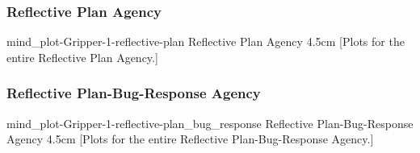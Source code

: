 {\newpage
  \noindent\begin{minipage}{\textwidth}
    \subsubsection{Reflective Plan Agency}
    \experimentcausegroupplots{\dataappendixmaxtime}
                           {\dataappendixexperimentonemaxtime}
                           {\dataappendixexperimenttwomaxtime}
                           {\dataappendixexperimentthreemaxtime}
                           {\dataappendixexperimentonename}
                           {\dataappendixexperimenttwoname}
                           {\dataappendixexperimentthreename}
                           {\dataappendixexperimentoneprettyname}
                           {\dataappendixexperimenttwoprettyname}
                           \experimentcausegroupplotscontinued{\dataappendixexperimentthreeprettyname}
                                                              {mind_plot-Gripper-1-reflective-plan}
                                                              {Reflective Plan Agency}
                                                              {\experimentdatacommontablereference}
                                                              {4.5cm}
    \experimentdatablocksworldexample
    [Plots for the entire
      Reflective Plan Agency.]{}
  \label{figure:mind_plot-Gripper-1-reflective-plan}
  \end{minipage}
}
{\newpage
  \noindent\begin{minipage}{\textwidth}
    \subsubsection{Reflective Plan-Bug-Response Agency}
    \experimentcausegroupplots{\dataappendixmaxtime}
                           {\dataappendixexperimentonemaxtime}
                           {\dataappendixexperimenttwomaxtime}
                           {\dataappendixexperimentthreemaxtime}
                           {\dataappendixexperimentonename}
                           {\dataappendixexperimenttwoname}
                           {\dataappendixexperimentthreename}
                           {\dataappendixexperimentoneprettyname}
                           {\dataappendixexperimenttwoprettyname}
                           \experimentcausegroupplotscontinued{\dataappendixexperimentthreeprettyname}
                                                              {mind_plot-Gripper-1-reflective-plan_bug_response}
                                                              {Reflective Plan-Bug-Response Agency}
                                                              {\experimentdatacommontablereference}
                                                              {4.5cm}
    \experimentdatablocksworldexample
    [Plots for the entire
      Reflective Plan-Bug-Response Agency.]{}
  \label{figure:mind_plot-Gripper-1-reflective-plan_bug_response}
  \end{minipage}
}
